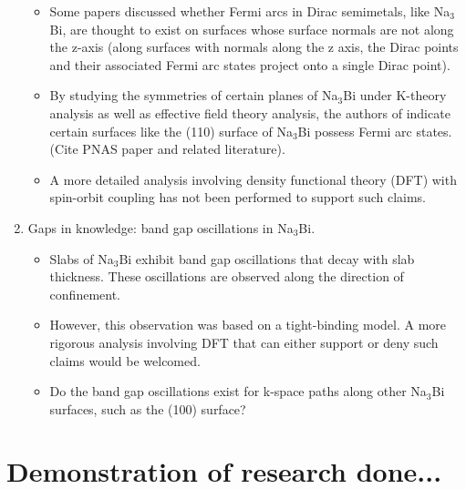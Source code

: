 \documentclass[english]{revtex4-1}
\begin{document}
\begin{enumerate}
    \begin{itemize}
    
        \item Some papers discussed whether Fermi arcs in Dirac semimetals, like Na$_3$Bi, are thought to exist on surfaces whose surface normals are not along the z-axis (along surfaces with normals along the z axis, the Dirac points and their associated Fermi arc states project onto a single Dirac point). \cite{kargarian_are_2016}

        \item By studying the symmetries of certain planes  of Na$_{3}$Bi under K-theory analysis as well as effective field theory analysis, the authors of \cite{kargarian_are_2016} indicate certain surfaces like the (110) surface of Na$_{3}$Bi possess Fermi arc states. (Cite PNAS paper and related literature).

        \item A more detailed analysis involving density functional theory (DFT) with spin-orbit coupling has not been performed to support such claims.

    \end{itemize}
   
     \item Gaps in knowledge: band gap oscillations in  Na$_3$Bi.
   
    \begin{itemize}
        
        \item Slabs of Na$_{3}$Bi exhibit band gap oscillations that decay with slab thickness. These oscillations are observed along the direction of confinement. \cite{xiao_anisotropic_2015}
        
        \item However, this observation was based on a tight-binding model.\cite{xiao_anisotropic_2015} A more rigorous analysis involving DFT that can either support or deny such claims would be welcomed.
        
        \item Do the band gap oscillations exist for k-space paths along other Na$_{3}$Bi surfaces, such as the (100) surface?
        
    \end{itemize}



\end{enumerate}


\section{Demonstration of research done...}
\end{document}
